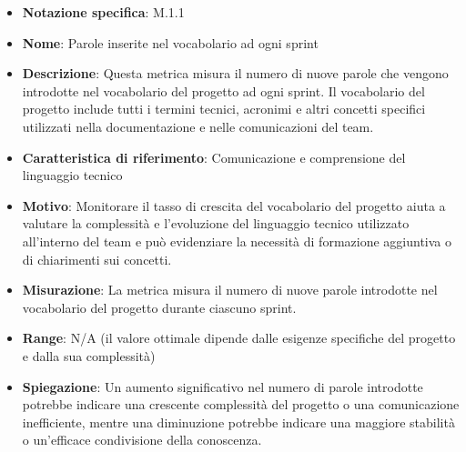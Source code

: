 \begin{itemize}
    \item \textbf{Notazione specifica}: M.1.1
    \item \textbf{Nome}: Parole inserite nel vocabolario ad ogni sprint
    \item \textbf{Descrizione}: Questa metrica misura il numero di nuove parole che vengono introdotte nel vocabolario del progetto ad ogni sprint. Il vocabolario del progetto include tutti i termini tecnici, acronimi e altri concetti specifici utilizzati nella documentazione e nelle comunicazioni del team.
    \item \textbf{Caratteristica di riferimento}: Comunicazione e comprensione del linguaggio tecnico
    \item \textbf{Motivo}: Monitorare il tasso di crescita del vocabolario del progetto aiuta a valutare la complessità e l'evoluzione del linguaggio tecnico utilizzato all'interno del team e può evidenziare la necessità di formazione aggiuntiva o di chiarimenti sui concetti.
    \item \textbf{Misurazione}: La metrica misura il numero di nuove parole introdotte nel vocabolario del progetto durante ciascuno sprint.
    \item \textbf{Range}: N/A (il valore ottimale dipende dalle esigenze specifiche del progetto e dalla sua complessità)
    \item \textbf{Spiegazione}: Un aumento significativo nel numero di parole introdotte potrebbe indicare una crescente complessità del progetto o una comunicazione inefficiente, mentre una diminuzione potrebbe indicare una maggiore stabilità o un'efficace condivisione della conoscenza.
\end{itemize}

